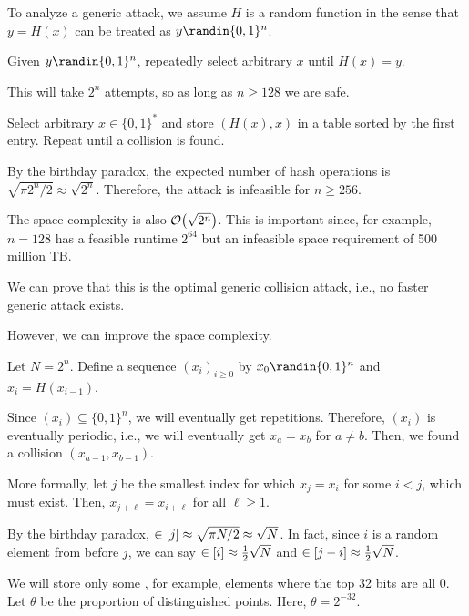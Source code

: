 \documentclass[class=co487,tikz,notes]{agony}
\begin{document}
To analyze a generic attack, we assume $H$ is a random function
in the sense that $y = H(x)$ can be treated as $y \randin \{0,1\}^n$.

\begin{attack}
  Given $y \randin\{0,1\}^n$, repeatedly select arbitrary $x$ until $H(x) = y$.
\end{attack}

This will take $2^n$ attempts, so as long as $n \geq 128$ we are safe.

\begin{attack}
  Select arbitrary $x \in \{0,1\}^*$ and store $(H(x),x)$ in a table
  sorted by the first entry. Repeat until a collision is found.
\end{attack}

By the birthday paradox, the expected number of hash operations is
$\sqrt{\pi 2^n/2} \approx \sqrt{2^n}$.
Therefore, the attack is infeasible for $n \geq 256$.

The space complexity is also $\order{\sqrt{2^n}}$.
This is important since, for example, $n=128$ has a feasible runtime $2^{64}$
but an infeasible space requirement of 500 million TB.

We can prove that this is the optimal generic collision attack, i.e.,
no faster generic attack exists.

However, we can improve the space complexity.

Let $N = 2^n$.
Define a sequence $(x_i)_{i\geq0}$ by $x_0 \randin \{0,1\}^n$
and $x_i = H(x_{i-1})$.

Since $(x_i) \subseteq \{0,1\}^n$, we will eventually get repetitions.
Therefore, $(x_i)$ is eventually periodic, i.e.,
we will eventually get $x_a = x_b$ for $a \neq b$.
Then, we found a collision $(x_{a-1}, x_{b-1})$.

More formally, let $j$ be the smallest index for which $x_j = x_i$
for some $i < j$, which must exist.
Then, $x_{j+\ell} = x_{i+\ell}$ for all $\ell \geq 1$.

By the birthday paradox, $\in[j] \approx \sqrt{\pi N/2} \approx \sqrt{N}$.
In fact, since $i$ is a random element from before $j$,
we can say $\in[i] \approx \frac12\sqrt{N}$ and $\in[j-i] \approx \frac12\sqrt{N}$.

We will store only some ,
for example, elements where the top 32 bits are all 0.
Let $\theta$ be the proportion of distinguished points.
Here, $\theta = 2^{-32}$.
\end{document}
